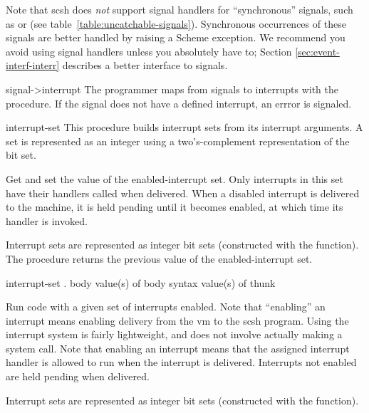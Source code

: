 Note that scsh does \emph{not} support signal handlers for
``synchronous'' {\Unix} signals, such as  or
 (see table~\ref{table:uncatchable-signals}).
Synchronous occurrences of these signals are better handled by raising
a Scheme exception.  We recommend you avoid using signal handlers
unless you absolutely have to; Section \ref{sec:event-interf-interr}
describes a better interface to signals.
\begin{defundesc}{signal->interrupt}{\integer}{\integer}
The programmer maps from {\Unix} signals to {\scm} interrupts with the
 procedure.
If the signal does not have a defined {\scm} interrupt, an errror is signaled.
\end{defundesc}


\begin{defundesc}{interrupt-set}{\zeroormore{\integer}}{\integer}
This procedure builds interrupt sets from its interrupt arguments.
A set is represented as an integer using a two's-complement representation of
the bit set.
\end{defundesc}


\begin{desc}
Get and set the value of the enabled-interrupt set.
Only interrupts in this set have their handlers called when delivered.
When a disabled interrupt is delivered to the {\scm} machine, it is
held pending until it becomes enabled, at which time its handler is invoked.

Interrupt sets are represented as integer bit sets (constructed with
the  function).
The  procedure returns the previous value of
the enabled-interrupt set.
\end{desc}

 {interrupt-set . body} {value(s) of body} {syntax}
 {value(s) of thunk}
\begin{desc}
Run code with a given set of interrupts enabled.
Note that ``enabling'' an interrupt means enabling delivery from
the {\scm} vm to the scsh program.
Using the {\scm} interrupt system is fairly lightweight, and does not involve
actually making a system call.
Note that enabling an interrupt means that the assigned interrupt handler
is allowed to run when the interrupt is delivered.
Interrupts not enabled are held pending when delivered.

Interrupt sets are represented as integer bit sets (constructed with
the  function).
\end{desc}


